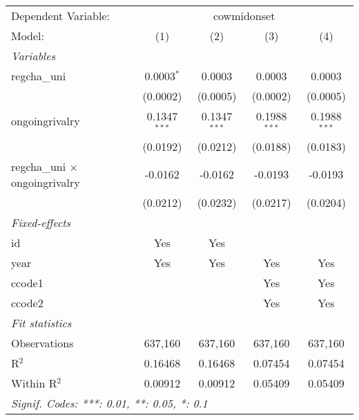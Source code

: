 
\begingroup
\centering
\begin{tabular}{lcccc}
   \tabularnewline \midrule \midrule
   Dependent Variable: & \multicolumn{4}{c}{cowmidonset}\\
   Model:                                & (1)            & (2)            & (3)            & (4)\\  
   \midrule
   \emph{Variables}\\
   regcha\_uni                           & 0.0003$^{*}$   & 0.0003         & 0.0003         & 0.0003\\   
                                         & (0.0002)       & (0.0005)       & (0.0002)       & (0.0005)\\   
   ongoingrivalry                        & 0.1347$^{***}$ & 0.1347$^{***}$ & 0.1988$^{***}$ & 0.1988$^{***}$\\   
                                         & (0.0192)       & (0.0212)       & (0.0188)       & (0.0183)\\   
   regcha\_uni $\times$ ongoingrivalry   & -0.0162        & -0.0162        & -0.0193        & -0.0193\\   
                                         & (0.0212)       & (0.0232)       & (0.0217)       & (0.0204)\\   
   \midrule
   \emph{Fixed-effects}\\
   id                                    & Yes            & Yes            &                & \\  
   year                                  & Yes            & Yes            & Yes            & Yes\\  
   ccode1                                &                &                & Yes            & Yes\\  
   ccode2                                &                &                & Yes            & Yes\\  
   \midrule
   \emph{Fit statistics}\\
   Observations                          & 637,160        & 637,160        & 637,160        & 637,160\\  
   R$^2$                                 & 0.16468        & 0.16468        & 0.07454        & 0.07454\\  
   Within R$^2$                          & 0.00912        & 0.00912        & 0.05409        & 0.05409\\  
   \midrule \midrule
   \multicolumn{5}{l}{\emph{Signif. Codes: ***: 0.01, **: 0.05, *: 0.1}}\\
\end{tabular}
\par\endgroup


